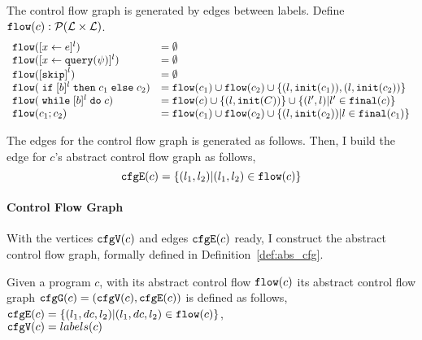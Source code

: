 The control flow graph is generated by edges between labels. 
Define ${\mathtt{flow}}(c): \mathcal{P}(\mathcal{L} \times \mathcal{L})$.
%
\[
 \begin{array}{ll}
    \cfgflow(\clabel{\assign{x}{\expr}}{}^l)  & = \emptyset  \\
    \cfgflow(\clabel{\assign{x}{\query(\qexpr)}}{}^l)   & = \emptyset  \\
    \cfgflow(\clabel{\eskip}^{l})  & = \emptyset \\
    \cfgflow(\eif [b]^l \ethen c_1 \eelse c_2) & =  \cfgflow(c_1) \cup \cfgflow(c_2)\cup \{(l, \cfginit(c_1)) , (l, \cfginit(c_2)) \} \\
    \cfgflow(\ewhile [b]^l \edo c)  & =  \cfgflow(c) \cup \{(l, \cfginit(C)) \} \cup \{(l', l)| l' \in \cfgfinal(c) \} \\
    \cfgflow(c_1 ; c_2)  & = \cfgflow(c_1) \cup  \cfgflow(c_2) \cup \{ (l, \cfginit(c_2)) | l \in \cfgfinal(c_1) \} \\
 \end{array}
 \]

The edges for the control flow graph is generated as follows.
Then, I build the edge for $c$'s abstract control flow graph as follows,
\[
  {\mathtt{cfgE}}(c) = \{(l_1, l_2) | (l_1, l_2) \in {\ensuremath{\mathtt{flow}}}(c)\}
  \]

%


\paragraph{Control Flow Graph} 
With the vertices ${\mathtt{cfgV}}(c)$ and edges ${\mathtt{cfgE}}(c)$ ready, I construct the abstract control flow graph, formally 
defined in 
Definition~\ref{def:abs_cfg}.
\begin{defn}
\label{def:cfg_graph}
Given a program $c$, 
with its abstract control flow ${\mathtt{flow}}(c)$
its abstract control flow graph ${\mathtt{cfgG}}(c) =({\mathtt{cfgV}}(c), {\mathtt{cfgE}}(c))$ is defined as follows,
\\
%
${\mathtt{cfgE}}(c) = \{(l_1, dc, l_2) | (l_1, dc, l_2) \in {\ensuremath{\mathtt{flow}}}(c)\}$,
\\
${\mathtt{cfgV}}(c) = labels(c)$
\end{defn}